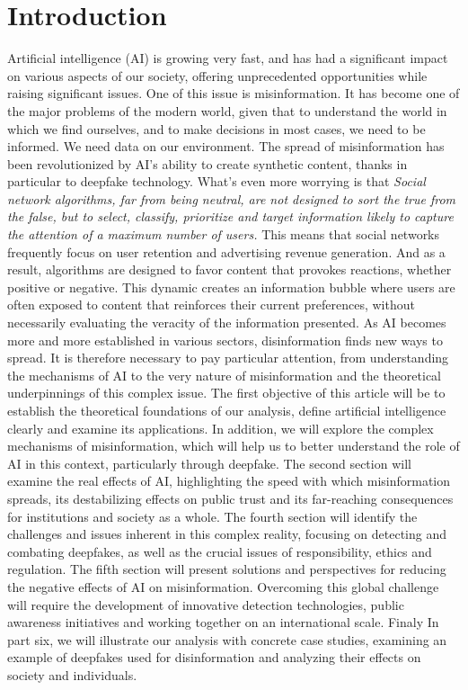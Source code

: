 \section{Introduction}
Artificial intelligence (AI) is growing very fast, and has had a significant impact on various aspects of our society, offering unprecedented opportunities while raising significant issues. One of this issue is misinformation. It has become one of the major problems of the modern world, given that to understand the world in which we find ourselves, and to make decisions in most cases, we need to be informed. We need data on our environment. The spread of misinformation has been revolutionized by AI's ability to create synthetic content, thanks in particular to deepfake technology. What's even more worrying is that \emph{Social network algorithms, far from being neutral, are not designed to sort the true from the false, but to select, classify, prioritize and target information likely to capture the attention of a maximum number of users\cite{InternetAutorouteDesinformation}.} This means that social networks frequently focus on user retention and advertising revenue generation. And as a result, algorithms are designed to favor content that provokes reactions, whether positive or negative. This dynamic creates an information bubble where users are often exposed to content that reinforces their current preferences, without necessarily evaluating the veracity of the information presented. As AI becomes more and more established in various sectors, disinformation finds new ways to spread. It is therefore necessary to pay particular attention, from understanding the mechanisms of AI to the very nature of misinformation and the theoretical underpinnings of this complex issue. The first objective of this article will be to establish the theoretical foundations of our analysis, define artificial intelligence clearly and examine its applications. In addition, we will explore the complex mechanisms of misinformation, which will help us to better understand the role of AI in this context, particularly through deepfake.
The second section will examine the real effects of AI, highlighting the speed with which misinformation spreads, its destabilizing effects on public trust and its far-reaching consequences for institutions and society as a whole.
The fourth section will identify the challenges and issues inherent in this complex reality, focusing on detecting and combating deepfakes, as well as the crucial issues of responsibility, ethics and regulation.
The fifth section will present solutions and perspectives for reducing the negative effects of AI on misinformation. Overcoming this global challenge will require the development of innovative detection technologies, public awareness initiatives and working together on an international scale.
Finaly In part six, we will illustrate our analysis with concrete case studies, examining an example of deepfakes used for disinformation and analyzing their effects on society and individuals.
